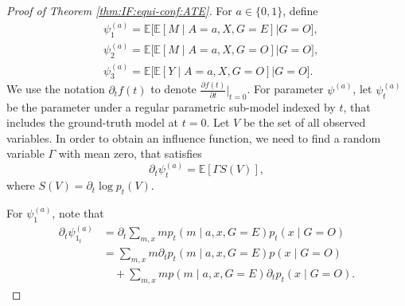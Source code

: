 \documentclass[10pt]{article}
\newcommand{\E}{\mathbb{E}}
\begin{document}
\begin{proof}[Proof of Theorem \ref{thm:IF:equi-conf:ATE}]

For $a\in\{0,1\}$, define
\begin{align*}
&\psi_1^{(a)}=
\E\big[\E[M\mid A=a,X,G=E]\big| G=O\big],\\
&\psi_2^{(a)}=
\E\big[\E[M\mid A=a,X,G=O]\big| G=O\big],\\
&\psi_3^{(a)}=
\E\big[\E[Y\mid A=a,X,G=O]\big| G=O\big].
\end{align*}
We use the notation $\partial_tf(t)$ to denote $\frac{\partial f(t)}{\partial t}\big|_{t=0}$.
For parameter $\psi^{(a)}$, let $\psi^{(a)}_t$ be the parameter under a regular parametric sub-model indexed by $t$, that includes the ground-truth model at $t=0$.
Let $V$ be the set of all observed variables.
In order to obtain an influence function, we need to find a random variable $\Gamma$ with mean zero, that satisfies
\[
\partial_t\psi^{(a)}_t=\E[\Gamma S(V)],
\]
where $S(V)=\partial_t\log p_t(V)$.

For $\psi_1^{(a)}$, note that
\begin{equation}
\label{eq:IF:equi:ate:1}
\begin{aligned}
\partial_t\psi^{(a)}_{1_t} 
&=\partial_t \sum_{m,x} mp_t(m\mid a,x,G=E)p_t(x\mid G=O)\\
&= \sum_{m,x} m\partial_t p_t(m\mid a,x,G=E)p(x\mid G=O)\\
&\quad+ \sum_{m,x} m p(m\mid a,x,G=E)\partial_t p_t(x\mid G=O).
\end{aligned}
\end{equation}


\end{proof}
\end{document}
